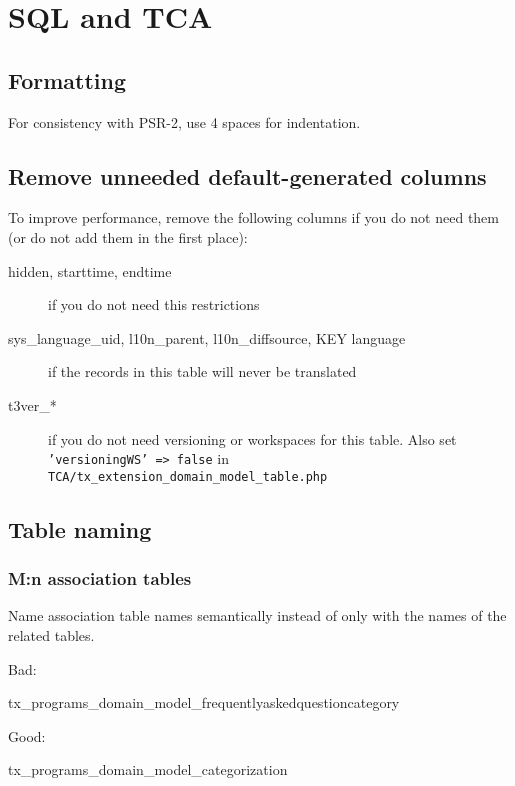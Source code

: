 \chapter{SQL and TCA}

\section{Formatting}
For consistency with PSR-2, use 4 spaces for indentation.

\section{Remove unneeded default-generated columns}

To improve performance, remove the following columns if you do not need them (or do not add them in the first place):

\begin{description}
  \item[hidden, starttime, endtime] if you do not need this restrictions
  \item[sys\_language\_uid, l10n\_parent, l10n\_diffsource, KEY language] if the records in this table will never be translated
  \item[t3ver\_*] if you do not need versioning or workspaces for this table. Also set \texttt{'versioningWS' => false} in \texttt{TCA/tx_extension_domain_model_table.php}
\end{description}


\section{Table naming}

\subsection{M:n association tables}

Name association table names semantically instead of only with the names of the related tables.

Bad:

\begin{sqlcode}
tx_programs_domain_model_frequentlyaskedquestioncategory
\end{sqlcode}

Good:

\begin{sqlcode}
tx_programs_domain_model_categorization
\end{sqlcode}


